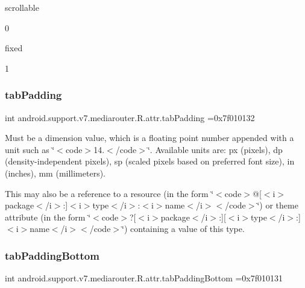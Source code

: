 {\ttfamily scrollable}

0

{\ttfamily fixed}

1\mbox{\label{classandroid_1_1support_1_1v7_1_1mediarouter_1_1R_1_1attr_ac68d44cf9810708b8ea458f8e156fa24}} 
\subsubsection{\texorpdfstring{tab\+Padding}{tabPadding}}
{\footnotesize\ttfamily int android.\+support.\+v7.\+mediarouter.\+R.\+attr.\+tab\+Padding =0x7f010132\hspace{0.3cm}{\ttfamily [static]}}

Must be a dimension value, which is a floating point number appended with a unit such as \char`\"{}$<$code$>$14.\+5sp$<$/code$>$\char`\"{}. Available units are\+: px (pixels), dp (density-\/independent pixels), sp (scaled pixels based on preferred font size), in (inches), mm (millimeters). 

This may also be a reference to a resource (in the form \char`\"{}$<$code$>$@\mbox{[}$<$i$>$package$<$/i$>$\+:\mbox{]}$<$i$>$type$<$/i$>$\+:$<$i$>$name$<$/i$>$$<$/code$>$\char`\"{}) or theme attribute (in the form \char`\"{}$<$code$>$?\mbox{[}$<$i$>$package$<$/i$>$\+:\mbox{]}\mbox{[}$<$i$>$type$<$/i$>$\+:\mbox{]}$<$i$>$name$<$/i$>$$<$/code$>$\char`\"{}) containing a value of this type. \mbox{\label{classandroid_1_1support_1_1v7_1_1mediarouter_1_1R_1_1attr_acc5b736693f1ab432a5ce0a3ee4d4b82}} 
\subsubsection{\texorpdfstring{tab\+Padding\+Bottom}{tabPaddingBottom}}
{\footnotesize\ttfamily int android.\+support.\+v7.\+mediarouter.\+R.\+attr.\+tab\+Padding\+Bottom =0x7f010131\hspace{0.3cm}{\ttfamily [static]}}

